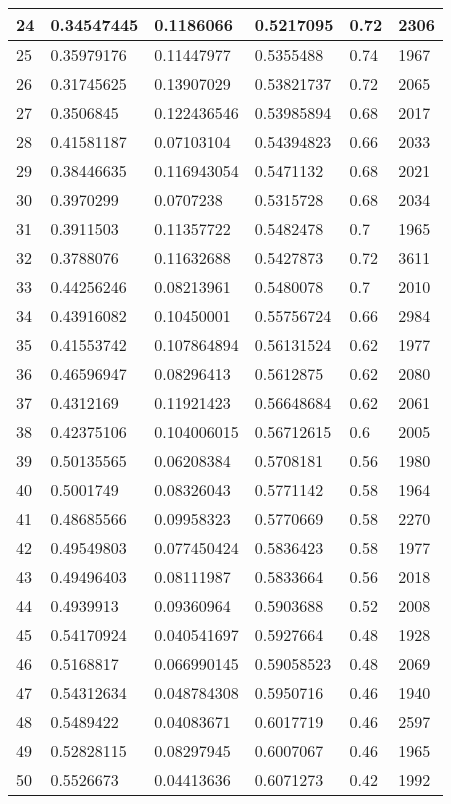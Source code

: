 \begin{longtable}{|l|l|l|l|l|l|}
24 & 0.34547445 & 0.1186066 & 0.5217095 & 0.72 & 2306 \\ \hline 
25 & 0.35979176 & 0.11447977 & 0.5355488 & 0.74 & 1967 \\ \hline 
26 & 0.31745625 & 0.13907029 & 0.53821737 & 0.72 & 2065 \\ \hline 
27 & 0.3506845 & 0.122436546 & 0.53985894 & 0.68 & 2017 \\ \hline 
28 & 0.41581187 & 0.07103104 & 0.54394823 & 0.66 & 2033 \\ \hline 
29 & 0.38446635 & 0.116943054 & 0.5471132 & 0.68 & 2021 \\ \hline 
30 & 0.3970299 & 0.0707238 & 0.5315728 & 0.68 & 2034 \\ \hline 
31 & 0.3911503 & 0.11357722 & 0.5482478 & 0.7 & 1965 \\ \hline 
32 & 0.3788076 & 0.11632688 & 0.5427873 & 0.72 & 3611 \\ \hline 
33 & 0.44256246 & 0.08213961 & 0.5480078 & 0.7 & 2010 \\ \hline 
34 & 0.43916082 & 0.10450001 & 0.55756724 & 0.66 & 2984 \\ \hline 
35 & 0.41553742 & 0.107864894 & 0.56131524 & 0.62 & 1977 \\ \hline 
36 & 0.46596947 & 0.08296413 & 0.5612875 & 0.62 & 2080 \\ \hline 
37 & 0.4312169 & 0.11921423 & 0.56648684 & 0.62 & 2061 \\ \hline 
38 & 0.42375106 & 0.104006015 & 0.56712615 & 0.6 & 2005 \\ \hline 
39 & 0.50135565 & 0.06208384 & 0.5708181 & 0.56 & 1980 \\ \hline 
40 & 0.5001749 & 0.08326043 & 0.5771142 & 0.58 & 1964 \\ \hline 
41 & 0.48685566 & 0.09958323 & 0.5770669 & 0.58 & 2270 \\ \hline 
42 & 0.49549803 & 0.077450424 & 0.5836423 & 0.58 & 1977 \\ \hline 
43 & 0.49496403 & 0.08111987 & 0.5833664 & 0.56 & 2018 \\ \hline 
44 & 0.4939913 & 0.09360964 & 0.5903688 & 0.52 & 2008 \\ \hline 
45 & 0.54170924 & 0.040541697 & 0.5927664 & 0.48 & 1928 \\ \hline 
46 & 0.5168817 & 0.066990145 & 0.59058523 & 0.48 & 2069 \\ \hline 
47 & 0.54312634 & 0.048784308 & 0.5950716 & 0.46 & 1940 \\ \hline 
48 & 0.5489422 & 0.04083671 & 0.6017719 & 0.46 & 2597 \\ \hline 
49 & 0.52828115 & 0.08297945 & 0.6007067 & 0.46 & 1965 \\ \hline 
50 & 0.5526673 & 0.04413636 & 0.6071273 & 0.42 & 1992 \\ \hline 
\end{longtable}